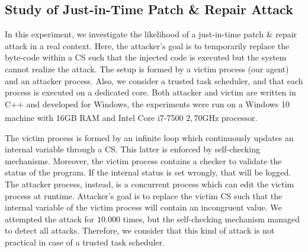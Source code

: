 
\subsection{Study of Just-in-Time Patch \& Repair Attack}
\label{sec:just-in-time}
In this experiment, we investigate the likelihood of a
just-in-time patch \& repair attack in a real context.
Here, the attacker's goal is to temporarily replace the byte-code within a CS 
such that the injected code is executed but the system cannot realize the 
attack.
The setup is formed by a victim process (\ie our agent) and an attacker 
process. %
Also, we consider a trusted task scheduler, and that each process is executed 
on a dedicated core.
Both attacker and victim are written in C++ and developed for Windows, the 
experiments were run on a Windows 10 machine with 16GB RAM and 
Intel\textsuperscript{\textregistered} Core\textsuperscript{\texttrademark} 
i7-7500 $2,70$GHz processor.

The victim process is formed by an infinite
loop which continuously updates an internal variable through a CS. This latter 
is enforced by self-checking mechanisms.
Moreover, the victim process contains a checker to validate the status of the 
program. If the internal status is set wrongly, that will be logged.
The attacker process, instead, is a concurrent process which can edit the 
victim process at runtime. Attacker's goal is to replace the victim CS such 
that the internal variable of the victim process will contain an incongruent 
value.
We attempted the attack for $10.000$ times, but the self-checking mechanism 
managed to detect all attacks.
Therefore, we consider that this kind of attack is not practical
in case of a trusted task scheduler.

